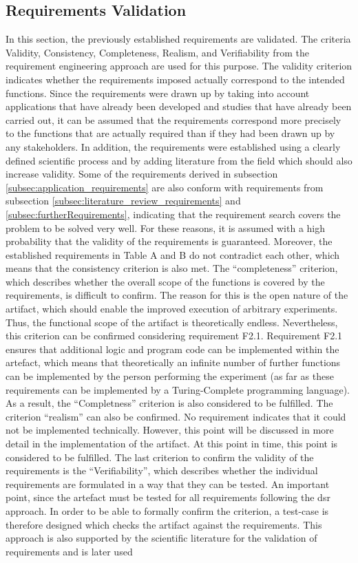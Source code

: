\newpage

\subsection{Requirements Validation}

In this section, the previously established requirements are validated. The criteria Validity, Consistency, Completeness, Realism, and Verifiability from the requirement engineering approach are used for this purpose. The validity criterion indicates whether the requirements imposed actually correspond to the intended functions. Since the requirements were drawn up by taking into account applications that have already been developed and studies that have already been carried out, it can be assumed that the requirements correspond more precisely to the functions that are actually required than if they had been drawn up by any stakeholders. In addition, the requirements were established using a clearly defined scientific process and by adding literature from the field which should also increase validity. Some of the requirements derived in subsection \ref{subsec:application_requirements} are also conform with requirements from subsection \ref{subsec:literature_review_requirements} and \ref{subsec:furtherRequirements}, indicating that the requirement search covers the problem to be solved very well. For these reasons, it is assumed with a high probability that the validity of the requirements is guaranteed. Moreover, the established requirements in Table A and B do not contradict each other, which means that the consistency criterion is also met. The \enquote{completeness} criterion, which describes whether the overall scope of the functions is covered by the requirements, is difficult to confirm. The reason for this is the open nature of the artifact, which should enable the improved execution of arbitrary experiments. Thus, the functional scope of the artifact is theoretically endless. Nevertheless, this criterion can be confirmed considering requirement F2.1. Requirement F2.1 ensures that additional logic and program code can be implemented within the artefact, which means that theoretically an infinite number of further functions can be implemented by the person performing the experiment (as far as these requirements can be implemented by a Turing-Complete programming language). As a result, the \enquote{Completness} criterion is also considered to be fulfilled. The criterion \enquote{realism} can also be confirmed. No requirement indicates that it could not be implemented technically. However, this point will be discussed in more detail in the implementation of the artifact. At this point in time, this point is considered to be fulfilled. The last criterion to confirm the validity of the requirements is the \enquote{Verifiability}, which describes whether the individual requirements are formulated in a way that they can be tested. An important point, since the artefact must be tested for all requirements following the \ac{dsr} approach. In order to be able to formally confirm the criterion, a test-case is therefore designed which checks the artifact against the requirements. This approach is also supported by the scientific literature for the validation of requirements and is later used 